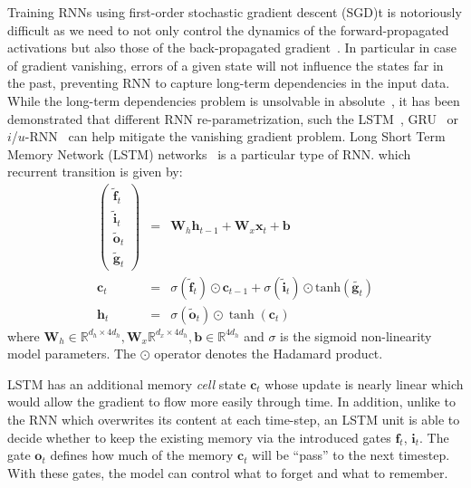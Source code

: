 \documentclass{article} %
\newcommand{\vect}[1]{\mathbf{#1}}
\newcommand{\mat}[1]{\mathbf{#1}}
\newcommand{\ewprod}{\odot}
\newcommand{\reals}{\mathbb{R}}
\begin{document}
Training RNNs using first-order stochastic gradient descent (SGD)t is notoriously difficult as we need to not only control the dynamics of the forward-propagated activations but also those of the back-propagated gradient~\cite{bengio1994learning,hochreiter1991untersuchungen,pascanudifficulty}.
In particular in case of gradient vanishing, errors of a given state will not influence the states far in the past,
 preventing RNN to capture long-term dependencies in the input data.
 While the long-term dependencies problem is unsolvable in absolute~\cite{bengio1994learning}, it has been demonstrated that different RNN re-parametrization, such the LSTM~\cite{lstm}, GRU~\cite{cho2014learning} or $i$/$u$-RNN~\cite{le2015simple,urnn} can help mitigate the vanishing gradient problem.
 Long Short Term Memory Network  (LSTM) networks~\cite{lstm} is a particular type of RNN. which recurrent transition is given by:
\begin{eqnarray}
\left(\begin{array}{ccc}
\tilde{\vect{f}}_t \\
\tilde{\vect{i}}_t \\
\tilde{\vect{o}}_t \\
\tilde{\vect{g}}_t
\end{array}\right)
 &=&
 \mat{W}_h \vect{h}_{t-1} +
 \mat{W}_x \vect{x}_t +
 \vect{b}
 \\
\vect{c}_t &= &\sigma(\tilde{\vect{f}}_t) \ewprod \vect{c}_{t-1} +
\sigma(\tilde{\vect{i}}_t) \ewprod \mathrm{tanh}(\tilde{\vect{g}_t}) \\
\vect{h}_t &= &\sigma(\tilde{\vect{o}}_t) \ewprod \tanh(\vect{c}_t)
\end{eqnarray}
where $\vect{W}_h \in \reals^{d_h \times 4 d_h}, \vect{W}_x \reals^{d_x \times 4 d_h}, \vect{b} \in \reals^{4 d_h}$ and $\sigma$ is the sigmoid non-linearity model parameters. The $\ewprod$ operator denotes the Hadamard product.

LSTM has an  additional memory \emph{cell} state $\vect{c}_t$ whose update is nearly linear which would
allow the gradient to flow more easily through time.
In addition, unlike to the RNN which overwrites its content at each time-step,
an LSTM unit is able to decide whether to keep the existing memory via the introduced gates $\vect{f}_t$, $\vect{i}_t$.
The gate $\vect{o}_t$ defines how much of the memory $\vect{c}_t$ will be ``pass'' to the next timestep.
With these gates, the model can control what to forget and what to remember.
\end{document}
